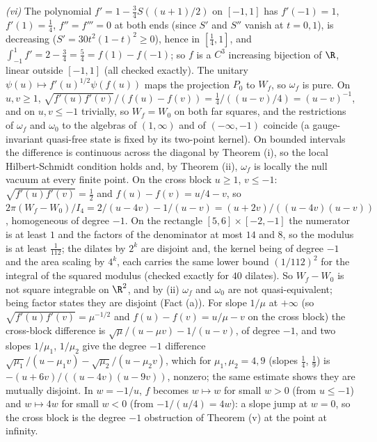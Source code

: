\emph{(vi)} The polynomial $f' = 1 - \tfrac34 S((u + 1)/2)$ on $[-1, 1]$ has $f'(-1) = 1$, $f'(1) = \tfrac14$, $f'' = f''' = 0$ at both ends (since $S'$ and $S''$ vanish at $t = 0, 1$), is decreasing ($S' = 30t^{2}(1 - t)^{2} \ge 0$), hence in $[\tfrac14, 1]$, and $\int_{-1}^{1}f' = 2 - \tfrac34 = \tfrac54 = f(1) - f(-1)$; so $f$ is a $C^{3}$ increasing bijection of $\R$, linear outside $[-1, 1]$ (all checked exactly). The unitary $\psi(u) \mapsto f'(u)^{1/2}\psi(f(u))$ maps the projection $P_{0}$ to $W_{f}$, so $\omega_{f}$ is pure. On $u, v \ge 1$, $\sqrt{f'(u)f'(v)}/(f(u) - f(v)) = \tfrac14/((u - v)/4) = (u - v)^{-1}$, and on $u, v \le -1$ trivially, so $W_{f} = W_{0}$ on both far squares, and the restrictions of $\omega_{f}$ and $\omega_{0}$ to the algebras of $(1, \infty)$ and of $(-\infty, -1)$ coincide (a gauge-invariant quasi-free state is fixed by its two-point kernel). On bounded intervals the difference is continuous across the diagonal by Theorem (i), so the local Hilbert-Schmidt condition holds and, by Theorem (ii), $\omega_{f}$ is locally the null vacuum at every finite point. On the cross block $u \ge 1$, $v \le -1$: $\sqrt{f'(u)f'(v)} = \tfrac12$ and $f(u) - f(v) = u/4 - v$, so $2\pi(W_{f} - W_{0})/I_{4} = 2/(u - 4v) - 1/(u - v) = (u + 2v)/((u - 4v)(u - v))$, homogeneous of degree $-1$. On the rectangle $[5, 6]\times[-2, -1]$ the numerator is at least $1$ and the factors of the denominator at most $14$ and $8$, so the modulus is at least $\tfrac{1}{112}$; the dilates by $2^{k}$ are disjoint and, the kernel being of degree $-1$ and the area scaling by $4^{k}$, each carries the same lower bound $(1/112)^{2}$ for the integral of the squared modulus (checked exactly for $40$ dilates). So $W_{f} - W_{0}$ is not square integrable on $\R^{2}$, and by (ii) $\omega_{f}$ and $\omega_{0}$ are not quasi-equivalent; being factor states they are disjoint (Fact (a)). For slope $1/\mu$ at $+\infty$ (so $\sqrt{f'(u)f'(v)} = \mu^{-1/2}$ and $f(u) - f(v) = u/\mu - v$ on the cross block) the cross-block difference is $\sqrt{\mu}/(u - \mu v) - 1/(u - v)$, of degree $-1$, and two slopes $1/\mu_{1}$, $1/\mu_{2}$ give the degree $-1$ difference $\sqrt{\mu_{1}}/(u - \mu_{1}v) - \sqrt{\mu_{2}}/(u - \mu_{2}v)$, which for $\mu_{1}, \mu_{2} = 4, 9$ (slopes $\tfrac14$, $\tfrac19$) is $-(u + 6v)/((u - 4v)(u - 9v))$, nonzero; the same estimate shows they are mutually disjoint. In $w = -1/u$, $f$ becomes $w \mapsto w$ for small $w > 0$ (from $u \le -1$) and $w \mapsto 4w$ for small $w < 0$ (from $-1/(u/4) = 4w$): a slope jump at $w = 0$, so the cross block is the degree $-1$ obstruction of Theorem (v) at the point at infinity.

